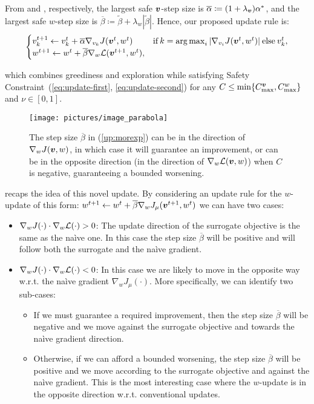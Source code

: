 From  and , respectively, the largest safe $\vv$-step size is $\overline{\alpha}\coloneqq(1+\lambda_{\vv})\alpha^*$, and the largest safe $w$-step size is $\overline{\beta}\coloneqq\tilde{\beta} + \lambda_{w}|\tilde{\beta}|$. Hence, our proposed update rule is:
%
\begin{align}\label{up:morexp}
\begin{cases}
v_{k}^{t+1} \gets v_{k}^t + \overline{\alpha}\gradJ[v_{k}]{\vv^t,w^t}
& \text{if}\:k =  \argmax_i |\gradJ[v_i]{\vv^t, w^t}| \:\text{else}\:v_{k}^t,\\
w^{t+1} \gets w^t + \overline{\beta}\gradDelta(\vv^{t+1}, w^t),
\end{cases}
\end{align}

which combines greediness and exploration while satisfying Safety Constraint~(\ref{eq:update-first}, \ref{eq:update-second}) for any ${C\leq\min\{C_{\text{max}}^{\vv},C_{\text{max}}^{w}\}}$ and $\nu\in[0,1]$. 

\begin{figure}
\texttt{[image: pictures/image\_parabola]}
\caption[Difference between $\nabla_w J(\cdot)$ and $\gradDelta(\cdot)$]{The step size $\overline{\beta}$ in (\ref{up:morexp}) can be in the direction of $\gradJ[w]{\vv, w}$, in which case it will guarantee an improvement, or can be in the opposite direction (in the direction of $\gradDelta(\vv, w)$) when $C$ is negative, guaranteeing a bounded worsening. }
\label{fig:boobs}
\end{figure}

 recaps the idea of this novel update. By considering an update rule for the $w$-update of this form: $w^{t+1} \gets w^t + \overline{\beta} \nabla_w J_\mu(\vv^{t+1}, w^t)$ we can have two cases:
\begin{itemize}
\item $\nabla_w J(\cdot) \cdot \nabla_w \Deltav(\cdot) > 0$: The update direction of the surrogate objective is the same as the na\`ive one. In this case the step size $\overline{\beta}$ will be positive and will follow both the surrogate and the na\`ive gradient.
\item $\nabla_w J(\cdot) \cdot \nabla_w \Deltav(\cdot) < 0$: In this case we are likely to move in the opposite way w.r.t. the na\`ive gradient $\nabla_w J_\mu(\cdot)$. More specifically, we can identify two sub-cases:
\begin{itemize}
\item If we must guarantee a required improvement, then the step size $\overline{\beta}$ will be negative and we move against the surrogate objective and towards the na\`ive gradient direction.
\item Otherwise, if we can afford a bounded worsening, the step size $\overline{\beta}$ will be positive and we move according to the surrogate objective and against the na\`ive gradient. This is the most interesting case where the $w$-update is in the opposite direction w.r.t. conventional updates.
\end{itemize}
\end{itemize}



